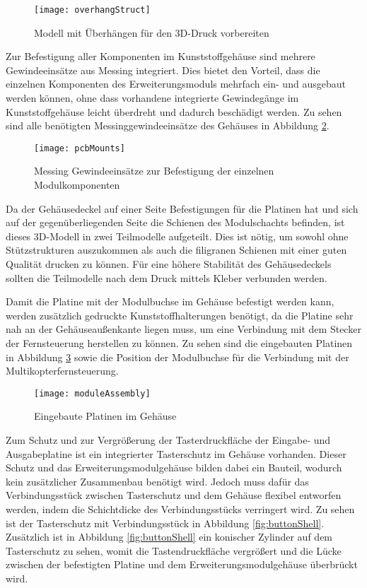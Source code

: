 \begin{figure}[h]
    \centering
    \texttt{[image: overhangStruct]}
    \caption{Modell mit Überhängen für den 3D-Druck vorbereiten}
    \label{fig:overhangStruct}
\end{figure}

Zur Befestigung aller Komponenten im Kunststoffgehäuse sind mehrere Gewindeeinsätze aus Messing integriert. Dies bietet den Vorteil, dass die einzelnen Komponenten des Erweiterungsmoduls mehrfach ein- und ausgebaut werden können, ohne dass vorhandene integrierte Gewindegänge im Kunststoffgehäuse leicht überdreht und dadurch beschädigt werden. Zu sehen sind alle benötigten Messinggewindeeinsätze des Gehäuses in Abbildung \ref{fig:pcbMounts}.

\begin{figure}[h]
    \centering
    \texttt{[image: pcbMounts]}
    \caption{Messing Gewindeeinsätze zur Befestigung der einzelnen Modulkomponenten}
    \label{fig:pcbMounts}
\end{figure}

Da der Gehäusedeckel auf einer Seite Befestigungen für die Platinen hat und sich auf der gegenüberliegenden Seite die Schienen des Modulschachts befinden, ist dieses 3D-Modell in zwei Teilmodelle aufgeteilt. Dies ist nötig, um sowohl ohne Stützstrukturen auszukommen als auch die filigranen Schienen mit einer guten Qualität drucken zu können. Für eine höhere Stabilität des Gehäusedeckels sollten die Teilmodelle nach dem Druck mittels Kleber verbunden werden.

Damit die Platine mit der Modulbuchse im Gehäuse befestigt werden kann, werden zusätzlich gedruckte Kunststoffhalterungen benötigt, da die Platine sehr nah an der Gehäuseaußenkante liegen muss, um eine Verbindung mit dem Stecker der Fernsteuerung herstellen zu können. Zu sehen sind die eingebauten Platinen in Abbildung \ref{fig:moduleAssembly} sowie die Position der Modulbuchse für die Verbindung mit der Multikopterfernsteuerung.

\begin{figure}[h]
    \centering
    \texttt{[image: moduleAssembly]}
    \caption{Eingebaute Platinen im Gehäuse}
    \label{fig:moduleAssembly}
\end{figure}

Zum Schutz und zur Vergrößerung der Tasterdruckfläche der Eingabe- und Ausgabeplatine ist ein integrierter Tasterschutz im Gehäuse vorhanden. Dieser Schutz und das Erweiterungsmodulgehäuse bilden dabei ein Bauteil, wodurch kein zusätzlicher Zusammenbau benötigt wird. Jedoch muss dafür das Verbindungsstück zwischen Tasterschutz und dem Gehäuse flexibel entworfen werden, indem die Schichtdicke des Verbindungsstücks verringert wird. Zu sehen ist der Tasterschutz mit Verbindungsstück in Abbildung \ref{fig:buttonShell}. Zusätzlich ist in Abbildung \ref{fig:buttonShell} ein konischer Zylinder auf dem Tasterschutz zu sehen, womit die Tastendruckfläche vergrößert und die Lücke zwischen der befestigten Platine und dem Erweiterungsmodulgehäuse überbrückt wird.

